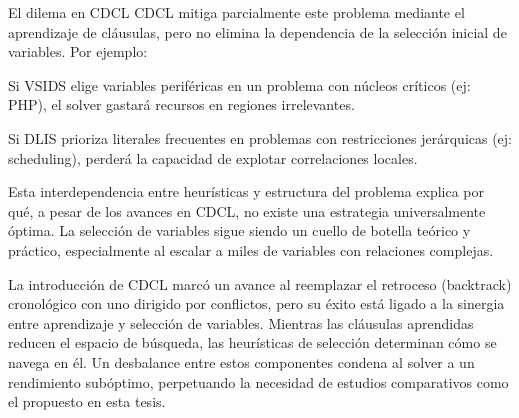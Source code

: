 \begin{conclusions}
El dilema en CDCL
CDCL mitiga parcialmente este problema mediante el aprendizaje de cláusulas, pero no elimina la dependencia de la selección inicial de variables. Por ejemplo:

Si VSIDS elige variables periféricas en un problema con núcleos críticos (ej: PHP), el solver gastará recursos en regiones irrelevantes.

Si DLIS prioriza literales frecuentes en problemas con restricciones jerárquicas (ej: scheduling), perderá la capacidad de explotar correlaciones locales.

Esta interdependencia entre heurísticas y estructura del problema explica por qué, a pesar de los avances en CDCL, no existe una estrategia universalmente óptima. La selección de variables sigue siendo un cuello de botella teórico y práctico, especialmente al escalar a miles de variables con relaciones complejas.

La introducción de CDCL marcó un avance al reemplazar el retroceso (backtrack) cronológico con uno dirigido por conflictos, pero su éxito está ligado a la sinergia entre aprendizaje y selección de variables. Mientras las cláusulas aprendidas reducen el espacio de búsqueda, las heurísticas de selección determinan cómo se navega en él. Un desbalance entre estos componentes condena al solver a un rendimiento subóptimo, perpetuando la necesidad de estudios comparativos como el propuesto en esta tesis. 
\end{conclusions}
